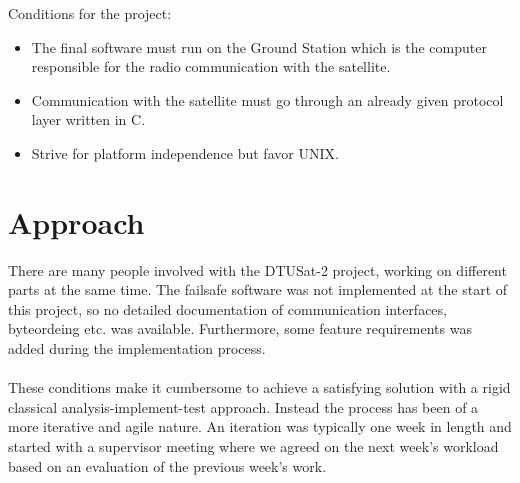 Conditions for the project:
\begin{itemize}
\item The final software must run on the Ground Station which is the computer responsible for the radio communication with the satellite.
\item Communication with the satellite must go through an already given protocol layer written in C.
\item Strive for platform independence but favor UNIX.
\end{itemize}

\section{Approach}
There are many people involved with the DTUSat-2 project, working on different parts at the same time. The failsafe software was not implemented at the start of this project, so no detailed documentation of communication interfaces, byteordeing etc. was available. Furthermore, some feature requirements was added during the implementation process.
\\ \\
These conditions make it cumbersome to achieve a satisfying solution with a rigid classical analysis-implement-test approach. Instead the process has been of a more iterative and agile nature. An iteration was typically one week in length and started with a supervisor meeting where we agreed on the next week's workload based on an evaluation of the previous week's work.

